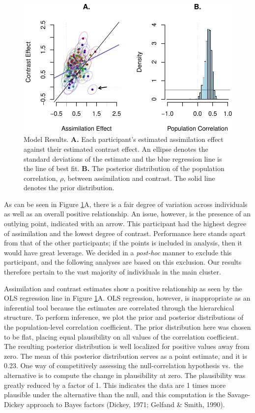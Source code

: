 \documentclass[english,floatsintext,man]{apa6}
\theoremstyle{definition}
\theoremstyle{definition}
\theoremstyle{definition}
\theoremstyle{remark}
\begin{document}
\begin{figure}[htbp]
\centering
\includegraphics{paper_files/figure-latex/modelfiguresminus-1.pdf}
\caption{\label{fig:modelfiguresminus}Model Results. \textbf{A.} Each
participant's estimated assimilation effect against their estimated
contrast effect. An ellipse denotes the standard deviations of the
estimate and the blue regression line is the line of best fit.
\textbf{B.} The posterior distribution of the population correlation,
\(\rho\), between assimilation and contrast. The solid line denotes the
prior distribution.}
\end{figure}

As can be seen in Figure \ref{fig:modelfiguresminus}A, there is a fair
degree of variation across individuals as well as an overall positive
relationship. An issue, however, is the presence of an outlying point,
indicated with an arrow. This participant had the highest degree of
assimilation and the lowest degree of contrast. Performance here stands
apart from that of the other participants; if the points is included in
analysis, then it would have great leverage. We decided in a
\emph{post-hoc} manner to exclude this participant, and the following
analyses are based on this exclusion. Our results therefore pertain to
the vast majority of individuals in the main cluster.

Assimilation and contrast estimates show a positive relationship as seen
by the OLS regression line in Figure \ref{fig:modelfiguresminus}A. OLS
regression, however, is inappropriate as an inferential tool because the
estimates are correlated through the hierarchical structure. To perform
inference, we plot the prior and posterior distributions of the
population-level correlation coefficient. The prior distribution here
was chosen to be flat, placing equal plausibility on all values of the
correlation coefficient. The resulting posterior distribution is well
localized for positive values away from zero. The mean of this posterior
distribution serves as a point estimate, and it is 0.23. One way of
competitively assessing the null-correlation hypothesis vs.~the
alternative is to compute the change in plausibility at zero. The
plausibility was greatly reduced by a factor of 1. This indicates the
data are 1 times more plausible under the alternative than the null, and
this computation is the Savage-Dickey approach to Bayes factors (Dickey,
1971; Gelfand \& Smith, 1990).
\end{document}
